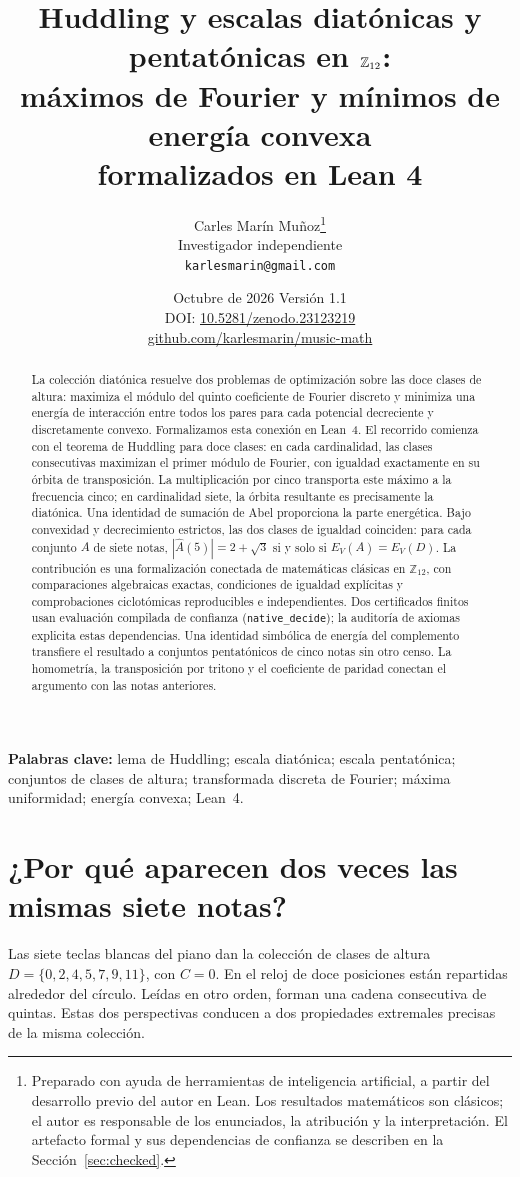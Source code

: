 \documentclass[11pt]{article}
\title{\bf Huddling y escalas diatónicas y pentatónicas en $\Ztwelve$:\\
máximos de Fourier y mínimos de energía convexa\\ formalizados en Lean 4}
\author{Carles Mar\'in Mu\~noz\thanks{Preparado con ayuda de herramientas de inteligencia artificial,
a partir del desarrollo previo del autor en Lean. Los resultados matemáticos son clásicos;
el autor es responsable de los enunciados, la atribución y la interpretación.
El artefacto formal y sus dependencias de confianza se describen en la Sección~\ref{sec:checked}.}\\[3pt]
\normalsize Investigador independiente\\
\normalsize \texttt{karlesmarin@gmail.com}}
\date{Octubre de 2026 \quad\textbullet\quad Versión 1.1\\[3pt]\normalsize DOI: \href{https://doi.org/10.5281/zenodo.23123219}{10.5281/zenodo.23123219}\\\href{https://github.com/karlesmarin/music-math}{github.com/karlesmarin/music-math}}
\newcommand{\lean}[1]{\texttt{#1}}
\newcommand{\Ztwelve}{\mathbb{Z}_{12}}
\newcommand{\Ahat}{\widehat A}
\begin{document}
\maketitle
\begin{abstract}\noindent
La colección diatónica resuelve dos problemas de optimización sobre las doce clases de altura:
maximiza el módulo del quinto coeficiente de Fourier discreto y minimiza una energía de
interacción entre todos los pares para cada potencial decreciente y discretamente convexo.
Formalizamos esta conexión en Lean~4. El recorrido comienza con el teorema de Huddling
para doce clases: en cada cardinalidad, las clases consecutivas maximizan el primer módulo
de Fourier, con igualdad exactamente en su órbita de transposición. La multiplicación por
cinco transporta este máximo a la frecuencia cinco; en cardinalidad siete, la órbita
resultante es precisamente la diatónica. Una identidad de sumación de Abel proporciona
la parte energética. Bajo convexidad y decrecimiento estrictos, las dos clases de igualdad
coinciden: para cada conjunto $A$ de siete notas,
$|\Ahat(5)|=2+\sqrt3$ si y solo si $E_V(A)=E_V(D)$.
La contribución es una formalización conectada de matemáticas clásicas en $\Ztwelve$,
con comparaciones algebraicas exactas, condiciones de igualdad explícitas y comprobaciones
ciclotómicas reproducibles e independientes. Dos certificados finitos usan evaluación
compilada de confianza (\lean{native\_decide}); la auditoría de axiomas explicita estas
dependencias. Una identidad simbólica de energía del
complemento transfiere el resultado a conjuntos pentatónicos de cinco notas sin otro censo.
La homometría, la transposición por tritono y el coeficiente de paridad conectan el
argumento con las notas anteriores.
\end{abstract}
\smallskip\noindent\textbf{Palabras clave:} lema de Huddling; escala diatónica; escala pentatónica;
conjuntos de clases de altura; transformada discreta de Fourier; máxima uniformidad;
energía convexa; Lean~4.

\section{¿Por qué aparecen dos veces las mismas siete notas?}\label{sec:hook}

Las siete teclas blancas del piano dan la colección de clases de altura
$D=\{0,2,4,5,7,9,11\}$, con $C=0$. En el reloj de doce posiciones están repartidas
alrededor del círculo. Leídas en otro orden, forman una cadena consecutiva de quintas.
Estas dos perspectivas conducen a dos propiedades extremales precisas de la misma colección.
\end{document}
